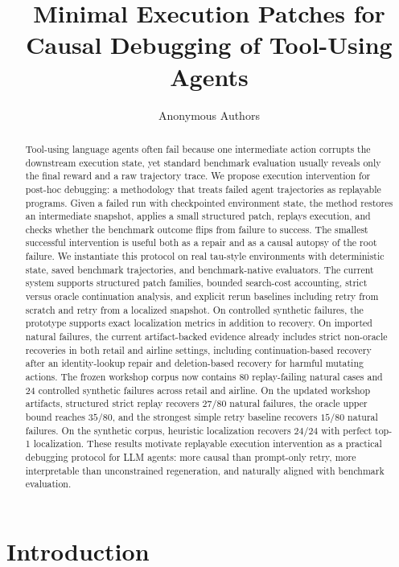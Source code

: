 \documentclass{article}
\title{Minimal Execution Patches for Causal Debugging of Tool-Using Agents}
\author{Anonymous Authors}
\begin{document}
\ifcolmsubmission
\linenumbers
\fi

\maketitle

\begin{abstract}
Tool-using language agents often fail because one intermediate action corrupts
the downstream execution state, yet standard benchmark evaluation usually
reveals only the final reward and a raw trajectory trace. We propose execution
intervention for post-hoc debugging: a methodology that treats failed agent
trajectories as replayable programs. Given a failed run with checkpointed
environment state, the method restores an intermediate snapshot, applies a
small structured patch, replays execution, and checks whether the benchmark
outcome flips from failure to success. The smallest successful intervention is
useful both as a repair and as a causal autopsy of the root failure. We
instantiate this protocol on real tau-style environments with deterministic
state, saved benchmark trajectories, and benchmark-native evaluators. The
current system supports structured patch families, bounded search-cost
accounting, strict versus oracle continuation analysis, and explicit rerun
baselines including retry from scratch and retry from a localized snapshot. On
controlled synthetic failures, the prototype supports exact localization
metrics in addition to recovery. On imported natural failures, the current
artifact-backed evidence already includes strict non-oracle recoveries in both
retail and airline settings, including continuation-based recovery after an
identity-lookup repair and deletion-based recovery for harmful mutating
actions. The frozen workshop corpus now contains $80$ replay-failing natural
cases and $24$ controlled synthetic failures across retail and airline. On the
updated workshop artifacts, structured strict replay recovers $27/80$ natural
failures, the oracle upper bound reaches $35/80$, and the strongest simple retry
baseline recovers $15/80$ natural failures. On the synthetic corpus, heuristic
localization recovers $24/24$ with perfect top-1 localization. These results motivate
replayable execution intervention as a practical debugging protocol for LLM
agents: more causal than prompt-only retry, more interpretable than
unconstrained regeneration, and naturally aligned with benchmark evaluation.
\end{abstract}

\section{Introduction}
\end{document}
